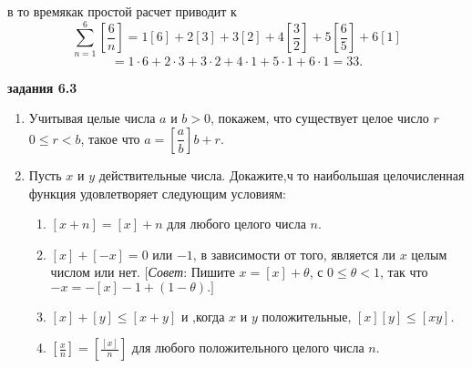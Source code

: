 \documentclass[11pt]{article}
\begin{document}
в то времякак простой расчет приводит к 
$$ \sum_{n=1}^{6}\left[ \frac{6}{n}\right]=1\left[ 6\right] +2\left[ 3\right] +3\left[ 2\right] +4\left[ \frac{3}{2}\right] +5\left[ \frac{6}{5}\right] +6\left[ 1\right] $$
$$=1\cdot6+2\cdot3+3\cdot2+4\cdot1+5\cdot1+6\cdot1=33. $$ 
\newpage
\begin{center}\Large\textbf{задания 6.3}\end{center}
\begin{enumerate}
	\item Учитывая целые числа $ a $ и $ b>0 $, покажем, что существует целое число $ r $ $ 0\le r<b $, такое что $ a=\left[\dfrac{a}{b}\right]b+r. $
	\item Пусть $ x $ и $ y $ действительные числа. Докажите,ч то наибольшая целочисленная функция удовлетворяет следующим условиям:
		\begin{enumerate}
			\item $ \left[ x+n\right] =\left[ x\right] +n $ для любого целого числа $ n. $
			\item $ \left[ x\right] +\left[ -x\right] =0 $ или $ -1 $, в зависимости от того, является ли $ x $ целым числом или нет. [\textit{Совет}: Пишите $ x=\left[ x\right] +\theta $, с $ 0\le\theta<1 $, так что $ -x=-\left[ x\right] -1+\left( 1-\theta\right).]  $
			\item $\left[ x\right] +\left[ y\right] \le \left[ x+y\right]$ и ,когда $ x $ и $ y $ положительные, $\left[ x\right]\left[ y\right] \le\left[ xy\right] $.
			\item $ \left[ \frac{x}{n}\right] =\left[ \frac{\left[ x\right] }{n}\right]  $ для любого положительного целого числа $ n $. 
			

\end{enumerate}
\end{enumerate}
\end{document}
